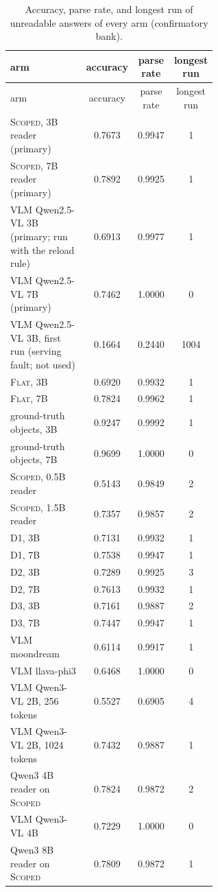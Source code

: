 \documentclass[10pt]{article}
\begin{document}
\begin{longtable}{@{}p{0.60\linewidth}ccc@{}}
\caption{Accuracy, parse rate, and longest run of unreadable answers of every arm (confirmatory bank).}\label{tab:s1}\\
\toprule arm & accuracy & parse rate & longest run \\ \midrule \endfirsthead
\toprule arm & accuracy & parse rate & longest run \\ \midrule \endhead
\bottomrule \endfoot
\textsc{Scoped}, 3B reader (primary) & 0.7673 & 0.9947 & 1 \\
\textsc{Scoped}, 7B reader (primary) & 0.7892 & 0.9925 & 1 \\
VLM Qwen2.5-VL 3B (primary; run with the reload rule) & 0.6913 & 0.9977 & 1 \\
VLM Qwen2.5-VL 7B (primary) & 0.7462 & 1.0000 & 0 \\
VLM Qwen2.5-VL 3B, first run (serving fault; not used) & 0.1664 & 0.2440 & 1004 \\
\textsc{Flat}, 3B & 0.6920 & 0.9932 & 1 \\
\textsc{Flat}, 7B & 0.7824 & 0.9962 & 1 \\
ground-truth objects, 3B & 0.9247 & 0.9992 & 1 \\
ground-truth objects, 7B & 0.9699 & 1.0000 & 0 \\
\textsc{Scoped}, 0.5B reader & 0.5143 & 0.9849 & 2 \\
\textsc{Scoped}, 1.5B reader & 0.7357 & 0.9857 & 2 \\
D1, 3B & 0.7131 & 0.9932 & 1 \\
D1, 7B & 0.7538 & 0.9947 & 1 \\
D2, 3B & 0.7289 & 0.9925 & 3 \\
D2, 7B & 0.7613 & 0.9932 & 1 \\
D3, 3B & 0.7161 & 0.9887 & 2 \\
D3, 7B & 0.7447 & 0.9947 & 1 \\
VLM moondream & 0.6114 & 0.9917 & 1 \\
VLM llava-phi3 & 0.6468 & 1.0000 & 0 \\
VLM Qwen3-VL 2B, 256 tokens & 0.5527 & 0.6905 & 4 \\
VLM Qwen3-VL 2B, 1024 tokens & 0.7432 & 0.9887 & 1 \\
Qwen3 4B reader on \textsc{Scoped} & 0.7824 & 0.9872 & 2 \\
VLM Qwen3-VL 4B & 0.7229 & 1.0000 & 0 \\
Qwen3 8B reader on \textsc{Scoped} & 0.7809 & 0.9872 & 1 \\

\end{longtable}
\end{document}
